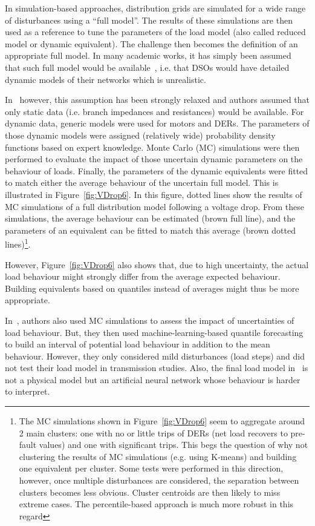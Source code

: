 In simulation-based approaches, distribution grids are simulated for a wide range of disturbances using a ``full model''. The results of these simulations are then used as a reference to tune the parameters of the load model (also called reduced model or dynamic equivalent). The challenge then becomes the definition of an appropriate full model. In many academic works, it has simply been assumed that such full model would be available~\cite{fulgencio}, i.e. that DSOs would have detailed dynamic models of their networks which is unrealistic.

In~\cite{ChaspierrePaper, ChaspierreThesis} however, this assumption has been strongly relaxed and authors assumed that only static data (i.e. branch impedances and resistances) would be available. For dynamic data, generic models were used for motors and DERs. The parameters of those dynamic models were assigned (relatively wide) probability density functions based on expert knowledge. Monte Carlo (MC) simulations were then performed to evaluate the impact of those uncertain dynamic parameters on the behaviour of loads. Finally, the parameters of the dynamic equivalents were fitted to match either the average behaviour of the uncertain full model. This is illustrated in Figure~\ref{fig:VDrop6}. In this figure, dotted lines show the results of MC simulations of a full distribution model following a voltage drop. From these simulations, the average behaviour can be estimated (brown full line), and the parameters of an equivalent can be fitted to match this average (brown dotted lines)\footnote{The MC simulations shown in Figure~\ref{fig:VDrop6} seem to aggregate around 2 main clusters: one with no or little trips of DERs (net load recovers to pre-fault values) and one with significant trips. This begs the question of why not clustering the results of MC simulations (e.g. using K-means) and building one equivalent per cluster. Some tests were performed in this direction, however, once multiple disturbances are considered, the separation between clusters becomes less obvious. Cluster centroids are then likely to miss extreme cases. The percentile-based approach is much more robust in this regard}.

However, Figure~\ref{fig:VDrop6} also shows that, due to high uncertainty, the actual load behaviour might strongly differ from the average expected behaviour. Building equivalents based on quantiles instead of averages might thus be more appropriate.

In~\cite{Vorwerk}, authors also used MC simulations to assess the impact of uncertainties of load behaviour. But, they then used machine-learning-based quantile forecasting to build an interval of potential load behaviour in addition to the mean behaviour. However, they only considered mild disturbances (load steps) and did not test their load model in transmission studies. Also, the final load model in~\cite{Vorwerk} is not a physical model but an artificial neural network whose behaviour is harder to interpret.

